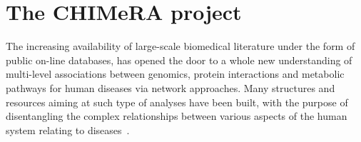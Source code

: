 \documentclass{standalone}
\begin{document}
\section[CHIMeRA]{The CHIMeRA project}\label{chimera:chimera}

The increasing availability of large-scale biomedical literature under the form of public on-line databases, has opened the door to a whole new understanding of multi-level associations between genomics, protein interactions and metabolic pathways for human diseases via network approaches.
Many structures and resources aiming at such type of analyses have been built, with the purpose of disentangling the complex relationships between various aspects of the human system relating to diseases~\cite{SymtomsNet, HumanPhenotype}.

\end{document}
